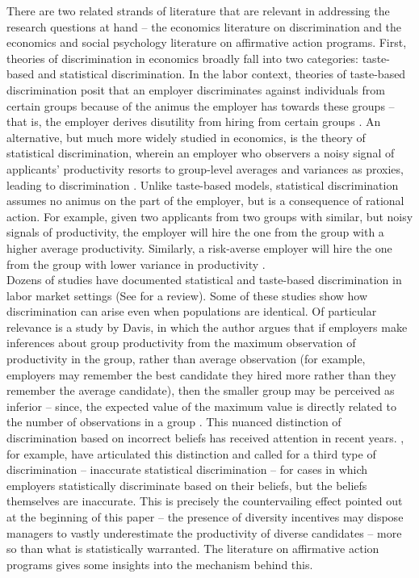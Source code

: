 \documentclass[11pt]{article}
\begin{document}
There are two related strands of literature that are relevant in addressing the research questions at hand -- the economics literature on discrimination and the economics and social psychology literature on affirmative action programs. First, theories of discrimination in economics broadly fall into two categories: taste-based and statistical discrimination. In the labor context, theories of taste-based discrimination posit that an employer discriminates against individuals from certain groups because of the animus the employer has towards these groups -- that is, the employer derives disutility from hiring from certain groups \parencite{becker_economics_1971}. An alternative, but much more widely studied in economics, is the theory of statistical discrimination, wherein an employer who observers a noisy signal of applicants' productivity resorts to group-level averages and variances as proxies, leading to discrimination \parencite{arrow_theory_1973,phelps_statistical_1972,aigner_statistical_1977}. Unlike taste-based models, statistical discrimination assumes no animus on the part of the employer, but is a consequence of rational action. For example, given two applicants from two groups with similar, but noisy signals of productivity, the employer will hire the one from the group with a higher average productivity. Similarly, a risk-averse employer will hire the one from the group with lower variance in productivity \parencite{aigner_statistical_1977}.
\\

Dozens of studies have documented statistical and taste-based discrimination in labor market settings (See \cite{bertrand_chapter_2017,anderson_discrimination_2005,guryan_tastebased_2013} for a review). Some of these studies show how discrimination can arise even when populations are identical. Of particular relevance is a study by Davis, in which the author argues that if employers make inferences about group productivity from the maximum observation of productivity in the group, rather than average observation (for example, employers may remember the best candidate they hired more rather than they remember the average candidate), then the smaller group may be perceived as inferior -- since, the expected value of the maximum value is directly related to the number of observations in a group \parencite{davis_maximal_1987}. This nuanced distinction of discrimination based on incorrect beliefs has received attention in recent years. \citeauthor{bohren_inaccurate_2019}, for example, have articulated this distinction and called for a third type of discrimination -- inaccurate statistical discrimination -- for cases in which employers statistically discriminate based on their beliefs, but the beliefs themselves are inaccurate. This is precisely the countervailing effect pointed out at the beginning of this paper -- the presence of diversity incentives may dispose managers to vastly underestimate the productivity of diverse candidates -- more so than what is statistically warranted. The literature on affirmative action programs gives some insights into the mechanism behind this.
\\
\end{document}
